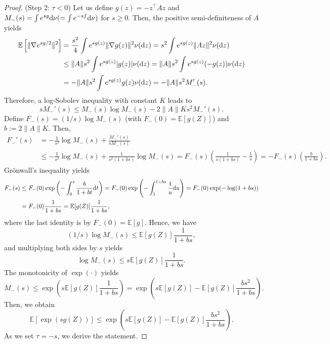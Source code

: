 \documentclass[11pt,a4paper]{article}
\theoremstyle{remark}
\theoremstyle{definition}
\newcommand{\bZ}{Z}
\newcommand{\bz}{z}
\newcommand{\bfA}{A}
\newcommand{\E}{\mathbb{E}}
\newcommand{\diff}{\textnormal{d}}
\theoremstyle{definition}
\begin{document}
\begin{bibunit}[apalike]
\begin{proof}
(Step 2: $\tau<0$) Let us define $g(\bz)=-\bz^{\top}\bfA\bz$ and $M_{-}(s)=\int e^{sg}\diff\nu(=\int e^{-sf}\diff\nu)$ for $s\ge0$.
Then, the positive semi-definiteness of $\bfA$ yields
\begin{align*}
    \E\left[\|\nabla e^{sg/2}\|^{2}\right]&=\frac{s^{2}}{4}\int e^{sg(\bz)}\|\nabla g(\bz)\|^{2}\nu(\diff\bz)= s^{2}\int e^{sg(\bz)}\|\bfA\bz\|^{2}\nu(\diff\bz)\\
    &\le \|\bfA\|s^{2}\int e^{sg(\bz)}|g(\bz)|\nu(\diff\bz)=\|\bfA\|s^{2}\int e^{sg(\bz)}(-g(\bz))\nu(\diff\bz)\\
    &=-\|\bfA\|s^{2}\int e^{sg(\bz)}g(\bz)\nu(\diff\bz)= -\|\bfA\|s^{2}M_{-}'(s).
\end{align*}
Therefore, a log-Sobolev inequality with constant $K$ leads to
\begin{equation*}
    sM_{-}'(s)\le M_{-}(s)\log M_{-}(s) -2\|\bfA\|Ks^{2}M_{-}'(s).
\end{equation*}
Define $F_{-}(s)=(1/s)\log M_{-}(s)$ (with $F_{-}(0)=\E[g(\bZ)]$) and $b:=2\|\bfA\|K$.
Then,
\begin{align*}
    F_{-}'(s)&=-\frac{1}{s^{2}}\log M_{-}(s)+\frac{M_{-}'(s)}{sM_{-}(s)}\\
    &\le-\frac{1}{s^{2}}\log M_{-}(s)+\frac{1}{s^{2}(1+bs)}\log M_{-}(s)=F_{-}(s)\left(\frac{1}{s(1+bs)}-\frac{1}{s}\right)=-F_{-}(s)\left(\frac{b}{1+bs}\right).
\end{align*}
Gr\"{o}nwall's inequality yields
\begin{align*}
    F_{-}(s)&\le F_{-}(0)\exp\left(-\int_{0}^{s}\frac{b}{1+bt}\diff t\right)=F_{-}(0)\exp\left(-\int_{1}^{1+bs}\frac{1}{u}\diff u\right)=F_{-}(0)\exp(-\log(1+bs))\\
    &=F_{-}(0)\frac{1}{1+bs}=\E[g(\bZ)]\frac{1}{1+bs},
\end{align*}
where the last identity is by $F_{-}(0)=\E[g]$.
Hence, we have
\begin{equation*}
    (1/s)\log M_{-}(s)\le \E[g(\bZ)]\frac{1}{1+bs},
\end{equation*}
and multiplying both sides by $s$ yields
\begin{equation*}
    \log M_{-}(s)\le s\E[g(\bZ)]\frac{1}{1+bs}.
\end{equation*}
The monotonicity of $\exp(\cdot)$ yields
\begin{equation*}
    M_{-}(s)\le \exp\left(s\E[g(\bZ)]\frac{1}{1+bs}\right)=\exp\left(s\E[g(\bZ)]-\E[g(\bZ)]\frac{bs^{2}}{1+bs}\right).
\end{equation*}
Then, we obtain
\begin{equation*}
    \E\left[\exp\left(sg(\bZ)\right)\right]\le \exp\left(s\E[g(\bZ)]-\E[g(\bZ)]\frac{bs^{2}}{1+bs}\right).
\end{equation*}
As we set $\tau=-s$, we derive the statement.
\end{proof}


\end{bibunit}
\end{document}
